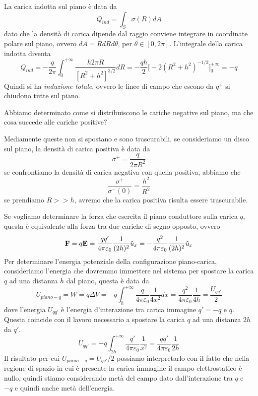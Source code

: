 \noindent La carica indotta sul piano \`e data da 
\begin{equation*}
	Q_{ind} = \int_{S} \sigma(R) dA
\end{equation*}
dato che la densit\`a di carica dipende dal raggio conviene integrare in coordinate polare sul piano, ovvero $dA = RdRd\theta$, per $\theta \in [0,2\pi]$. L'integrale della carica indotta diventa
\begin{equation*}
	Q_{ind} = -\frac{q}{2 \pi} \int_{0}^{+\infty} \frac{h 2 \pi R}{[R^2+h^2]^{3/2}}dR = -\frac{qh}{2} 
	\Big [-2(R^2+h^2)^{-1/2}\Big ]_{0}^{+\infty} =-q
\end{equation*}
Quindi si ha \textit{induzione totale}, ovvero le linee di campo che escono da $q^+$ si chiudono tutte sul piano.

Abbiamo determinato come si distribuiscono le cariche negative sul piano, ma che cosa succede alle cariche positive?

Mediamente queste non si spostano e sono trascurabili, se consideriamo un disco sul piano, la densit\`a di carica positiva \`e data da 
\begin{equation*}
	\sigma^+ = \frac{q}{2 \pi R^2}
\end{equation*}
se confrontiamo la densit\`a di carica negativa con quella positiva, abbiamo che 
\begin{equation*}
	\frac{\sigma^+}{\sigma^-(0)} = \frac{h^2}{R^2} 
\end{equation*}
se prendiamo $R >> h$, avremo che la carica positiva risulta essere trascurabile. 

Se vogliamo determinare la forza che esercita il piano conduttore sulla carica $q$, questa \`e equivalente alla forza tra due cariche di segno opposto, ovvero
\begin{equation*}
	\bold{F} = q\bold{E} = \frac{q q'}{4\pi \varepsilon_0} \frac{1}{(2h)^2} \hat{u}_{x} = -\frac{q^2}{4 \pi \varepsilon_0} \frac{1}{(2h)^2} \hat{u}_{x}
\end{equation*}
Per determinare l'energia potenziale della configurazione piano-carica, consideriamo l'energia che dovremmo immettere nel sistema per spostare la carica $q$ ad una distanza $h$ dal piano, questa \`e data da 
\begin{equation*}
	U_{piano-q}= W = q\Delta V = -q \int_{h}^{+ \infty} \frac{q}{4\pi \varepsilon_0} \frac{1}{4x^2}dx = \frac{q^2}{4 \pi \varepsilon_0} \frac{1}{4h} = \frac{U_{qq'}}{2}
\end{equation*}
dove l'energia $U_{qq'}$ \`e l'energia d'interazione tra carica immagine $q' = -q$ e $q$. Questa coincide con il lavoro necessario a spostare la carica $q$ ad una distanza $2h$ da $q'$.
\begin{equation*}
	U_{qq'} = -q \int_{2h}^{+\infty} \frac{q'}{4 \pi \varepsilon_0}\frac{1}{x^2}= \frac{qq'}{4 \pi \varepsilon_0}\frac{1}{2h}
\end{equation*}
Il risultato per cui $U_{piano-q} = U_{qq'}/2$ possiamo interpretarlo con il fatto che nella regione di spazio in cui \`e presente la carica immagine il campo elettrostatico \`e nullo, quindi stiamo considerando met\`a del campo dato dall'interazione tra $q$ e $-q$ e quindi anche met\`a dell'energia.

